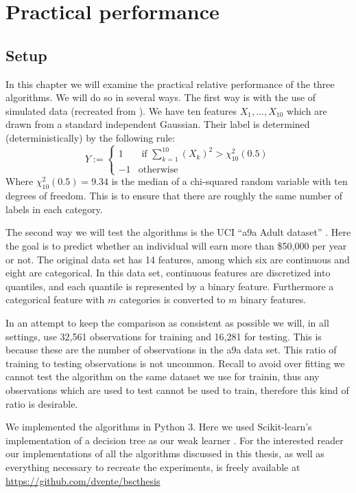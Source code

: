


\chapter{Practical performance}
\label{chap:pracPerf}
\section{Setup}
\label{sec:Setup}
In this chapter we will examine the practical relative performance of the three algorithms. We will do so in several ways. The first way is with the use of simulated data (recreated from \cite{Hastie2009}). We have ten features $X_1,\ldots,X_{10}$ which are drawn from a standard independent Gaussian. Their label is determined (deterministically) by the following rule: $$Y:=\begin{cases}
1 & \text{ if } \sum_{k=1}^{10} (X_k)^2 > \chi_{10}^2(0.5)\\
-1 & \text{otherwise}
\end{cases}$$ Where $\chi_{10}^2(0.5)=9.34$ is the median of a chi-squared random variable with ten degrees of freedom. This is to ensure that there are roughly the same number of labels in each category. 

\par The second way we will test the algorithms is the UCI ``a9a Adult dataset'' \cite{LIBSVM}. Here the goal is to predict whether an individual will earn more than \$50,000 per year or not. The original data set has 14 features, among which six are continuous and eight are categorical. In this data set, continuous features are discretized into quantiles, and each quantile is represented by a binary feature. Furthermore a categorical feature with $m$ categories is converted to $m$ binary features. 

\par In an attempt to keep the comparison as consistent as possible we will, in all settings, use 32,561 observations for training and 16,281 for testing. This is because these are the number of observations in the a9a data set. This ratio of training to testing observations is not uncommon. Recall to avoid over fitting we cannot test the algorithm on the same dataset we use for trainin, thus any observations which are used to test cannot be used to train, therefore this kind of ratio is desirable.

\par We implemented the algorithms in Python 3. Here we used Scikit-learn's implementation of a decision tree as our weak learner \cite{Pedregosa2012}. For the interested reader our implementations of all the algorithms discussed in this thesis, as well as everything necessary to recreate the experiments, is freely available at \url{https://github.com/dvente/bscthesis} 

